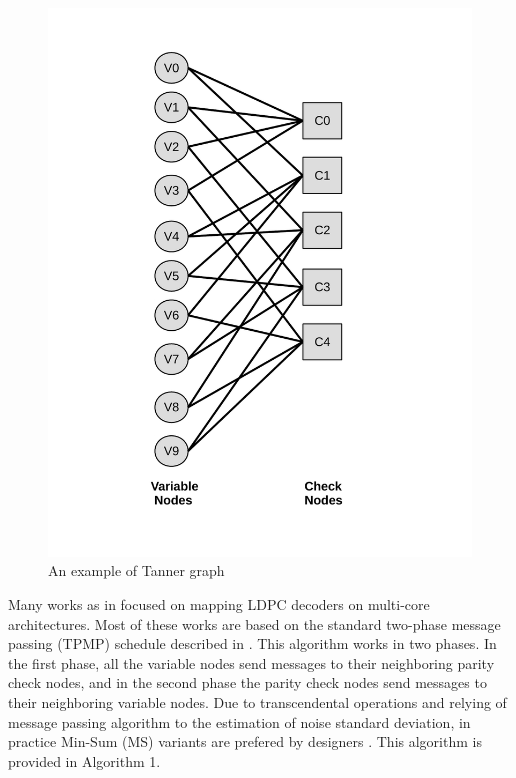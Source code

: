 \documentclass[conference]{IEEEtran}
\begin{document}
\begin{figure}[h]\label{tanner}
\begin{centering}
\includegraphics[scale=0.35]{tanner.pdf}
\caption[width=.3\textwidth]{An example of Tanner graph}
\end{centering}
\end{figure}

Many works as in \cite{art_massively, art_ldpc_cpu0,art_ldpc_OpenCl,art_gpu_0} focused on mapping LDPC decoders on multi-core architectures. Most of these works are based on the standard two-phase message passing (TPMP) schedule described in \cite{art_massively}. This algorithm works in two phases. In the first phase, all the variable nodes send messages to their neighboring parity check nodes, and in the second phase the parity check nodes send messages to their neighboring variable nodes. Due to transcendental operations and relying of message passing algorithm to the estimation of noise standard deviation, in practice Min-Sum (MS) variants are prefered by designers \cite{art_neon}. This algorithm is provided in Algorithm 1.
\end{document}
